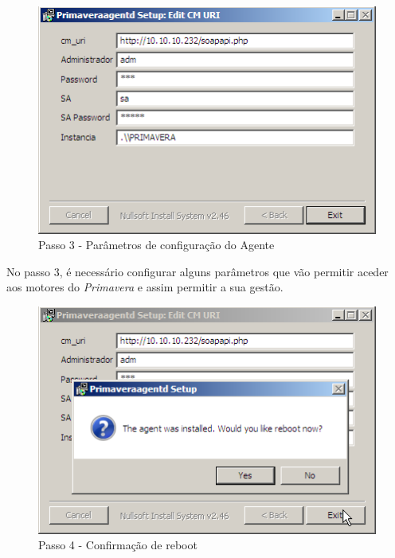 \begin{figure}[H]
    \begin{center}
    \includegraphics[scale=0.38]{screenshots/primavera/primaverainstall_03.png}
    \caption{Passo 3 - Parâmetros de configuração do Agente}
    \label{fig:primavera_install_passo3}
    \end{center}
\end{figure}

No passo 3, é necessário configurar alguns parâmetros que vão permitir aceder aos motores do \textit{Primavera} e assim permitir a sua gestão.

\begin{figure}[H]
    \begin{center}
    \includegraphics[scale=0.38]{screenshots/primavera/primaverainstall_04.png}
    \caption{Passo 4 - Confirmação de reboot}
    \label{fig:primavera_install_passo4}
    \end{center}
\end{figure}

